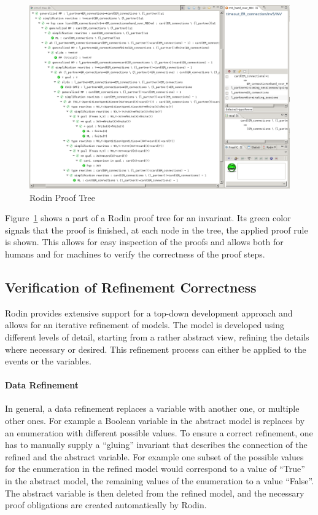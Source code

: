 \documentclass{article}
\begin{document}
\begin{figure}[ht]
  \centering
  \includegraphics[width=1\textwidth]{pictures/ProofTree}
  \caption{Rodin Proof Tree}
  \label{fig:proof-tree}
\end{figure}

Figure~\ref{fig:proof-tree} shows a part of a Rodin proof tree for an
invariant. Its green color signals that the proof is finished, at each node in
the tree, the applied proof rule is shown. This allows for easy inspection of
the proofs and allows both for humans and for machines to verify the correctness
of the proof steps.


\subsection{Verification of Refinement Correctness}
\label{sec:verif-refin-corr}

Rodin provides extensive support for a top-down development approach and allows
for an iterative refinement of models. The model is developed using different
levels of detail, starting from a rather abstract view, refining the details
where necessary or desired. This refinement process can either be applied to
the events or the variables.

\paragraph{Data Refinement}
\label{sec:data-refinement}

In general, a data refinement replaces a variable with another one, or multiple
other ones. For example a Boolean variable in the abstract model is replaces by
an enumeration with different possible values. To ensure a correct refinement,
one has to manually supply a ``gluing'' invariant that describes the connection
of the refined and the abstract variable. For example one subset of the possible
values for the enumeration in the refined model would correspond to a value of
``True'' in the abstract model, the remaining values of the enumeration to a
value ``False''. The abstract variable is then deleted from the refined model,
and the necessary proof obligations are created automatically by Rodin.
\end{document}

